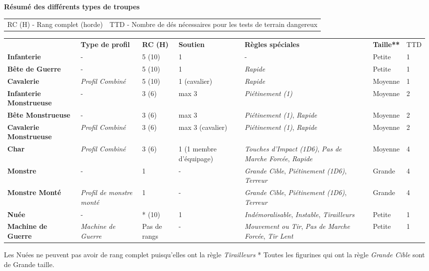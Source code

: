 {
\footnotesize

{\normalsize \noindent \textbf{Résumé des différents types de troupes}}

\renewcommand{\arraystretch}{1.1}
\setlength{\tabcolsep}{2pt}
\noindent
\begin{tabular}{m{5cm}l}
RC (H) - Rang complet (horde)
&
TTD - Nombre de dés nécessaires pour les tests de terrain dangereux
\end{tabular}
\newline \noindent
\begin{tabular}{M{3.5cm}M{1.9cm}M{0.9cm}M{2.3cm}M{3.9cm}M{1.4cm}M{0.7cm}}
 & \textbf{Type de profil} & \textbf{RC (H)} & \textbf{Soutien} & \textbf{Règles spéciales} & \textbf{Taille**} & TTD \\
 \textbf{Infanterie} & - & 5 (10) & 1 & - & Petite & 1 \\
\textbf{Bête de Guerre} & - & 5 (10) & 1 & \emph{Rapide} & Petite & 1 \\
 \textbf{Cavalerie} & \emph{Profil Combiné} & 5 (10) & 1 (cavalier) & \emph{Rapide} & Moyenne & 1 \\
\textbf{Infanterie Monstrueuse} & - & 3 (6) & max 3 & \emph{Piétinement (1)} & Moyenne & 2 \\
 \textbf{Bête Monstrueuse} & - & 3 (6) & max 3 & \emph{Piétinement (1)}, \emph{Rapide} & Moyenne & 2 \\
\textbf{Cavalerie Monstrueuse} & \emph{Profil Combiné} & 3 (6) & max 3 (cavalier) & \emph{Piétinement (1)}, \emph{Rapide} & Moyenne & 2 \\
 \textbf{Char} & \emph{Profil Combiné} & 3 (6) & 1 (1 membre d'équipage) & \emph{Touches d'Impact (1D6)}, \emph{Pas de Marche Forcée}, \emph{Rapide} & Moyenne & 4 \\
\textbf{Monstre} & - & 1 & - & \emph{Grande Cible}, \emph{Piétinement (1D6)}, \emph{Terreur} & Grande & 4 \\
 \textbf{Monstre Monté} & \emph{Profil de monstre monté} & 1 & - & \emph{Grande Cible}, \emph{Piétinement (1D6)}, \emph{Terreur} & Grande & 4 \\
\textbf{Nuée} & - & * (10) & 1 & \emph{Indémoralisable}, \emph{Instable}, \emph{Tirailleurs} & Petite & 1 \\
 \textbf{Machine de Guerre} & \emph{Machine de Guerre} & Pas de rangs & - & \emph{Mouvement ou Tir}, \emph{Pas de Marche Forcée}, \emph{Tir Lent} & Petite & 1 \\
\end{tabular}
\newline * Les Nuées ne peuvent pas avoir de rang complet puisqu'elles ont la règle  \emph{Tirailleurs}
\newline ** Toutes les figurines qui ont la règle \emph{Grande Cible} sont de Grande taille.


}
